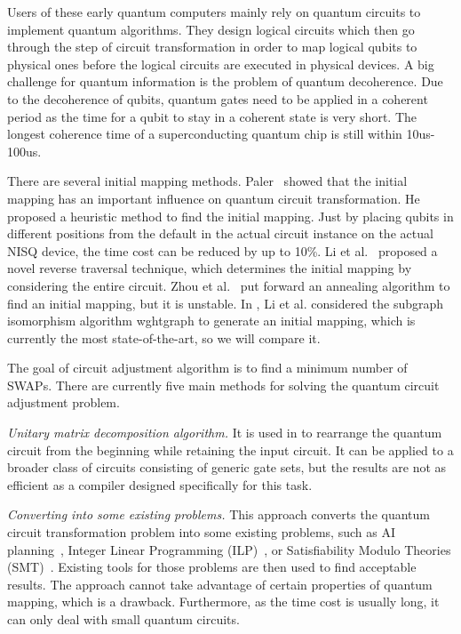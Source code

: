\documentclass[runningheads]{llncs}
\begin{document}
Users of these early quantum computers mainly rely on quantum circuits to implement quantum algorithms. They design logical circuits which then go through the step of circuit transformation in order to map logical qubits to physical ones before the logical circuits are executed in physical devices. A big challenge for quantum information is the problem of quantum decoherence. Due to the decoherence of qubits, quantum gates need to be applied in a coherent period as the time for a qubit to stay in a coherent state is very short. The longest coherence time of a superconducting quantum chip is still within 10us-100us. 

There are several initial mapping methods. Paler~\cite{Paler2018} showed that the initial mapping has an important influence on quantum circuit transformation. He proposed a heuristic method to find the initial mapping. Just by placing qubits in different positions from the default in the actual circuit instance on the actual NISQ device, the time cost can be reduced by up to 10\%. Li et al.~\cite{Li2018} proposed a novel reverse traversal technique, which determines the initial mapping by considering the entire circuit. Zhou et al.~\cite{Xiangzhen2020} put forward an annealing algorithm to find an initial mapping, but it is unstable. In \cite{2020Qubit}, Li et al. considered the subgraph isomorphism algorithm wghtgraph to generate an initial mapping, which is currently the most state-of-the-art, so we will compare it.

The goal of circuit adjustment algorithm is to find a minimum number of SWAPs. There are currently five main methods for solving the quantum circuit adjustment problem.

\emph{Unitary matrix decomposition algorithm.} It is used in \cite{2019CNOT,2019Quantum} to rearrange the quantum circuit from the beginning while retaining the input circuit. It can be applied to a broader class of circuits consisting of generic gate sets, but the results are not as efficient as a compiler designed specifically for this task.

\emph{Converting into some existing problems.} This approach converts the quantum circuit transformation problem into some existing problems, such as AI planning~\cite{2017Temporal,2018Integer}, Integer Linear Programming (ILP)~\cite{2019Almeida}, or Satisfiability Modulo Theories (SMT)~\cite{2019Murali}. Existing tools for those problems are then used to find acceptable results. The approach cannot take advantage of certain properties of quantum mapping, which is a drawback. Furthermore, as the time cost is usually long, it can only deal with small quantum circuits.
\end{document}

